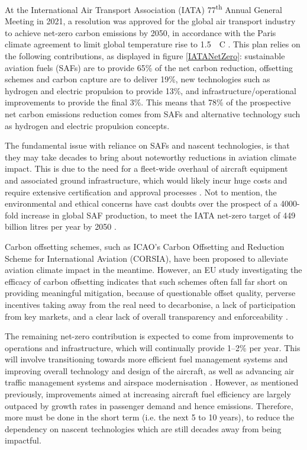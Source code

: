 At the International Air Transport Association (IATA) 77\textsuperscript{th} Annual General Meeting in 2021, a resolution was approved for the global air transport industry to achieve net-zero carbon emissions by 2050, in accordance with the Paris climate agreement to limit global temperature rise to 1.5~\textdegree~C \cite{IATANetZero}. This plan relies on the following contributions, as displayed in figure \ref{IATANetZero}: sustainable aviation fuels (SAFs) are to provide 65\% of the net carbon reduction, offsetting schemes and carbon capture are to deliver 19\%, new technologies such as hydrogen and electric propulsion to provide 13\%, and infrastructure/operational improvements to provide the final 3\%. This means that 78\% of the prospective net carbon emissions reduction comes from SAFs and alternative technology such as hydrogen and electric propulsion concepts. 

The fundamental issue with reliance on SAFs and nascent technologies, is that they may take decades to bring about noteworthy reductions in aviation climate impact. This is due to the need for a fleet-wide overhaul of aircraft equipment and associated ground infrastructure, which would likely incur huge costs and require extensive certification and approval processes \cite{ICF2021}. Not to mention, the environmental and ethical concerns have cast doubts over the prospect of a 4000-fold increase in global SAF production, to meet the IATA net-zero target of 449 billion litres per year by 2050 \cite{IATANetZero, Henoi2022}. 

Carbon offsetting schemes, such as ICAO's Carbon Offsetting and Reduction Scheme for International Aviation (CORSIA), have been proposed to alleviate aviation climate impact in the meantime. However, an EU study investigating the efficacy of carbon offsetting indicates that such schemes often fall far short on providing meaningful mitigation, because of questionable offset quality, perverse incentives taking away from the real need to decarbonise, a lack of participation from key markets, and a clear lack of overall transparency and enforceability \cite{TandE2021, TandE2020}.

The remaining net-zero contribution is expected to come from improvements to operations and infrastructure, which will continually provide 1--2\% per year. This will involve transitioning towards more efficient fuel management systems and improving overall technology and design of the aircraft, as well as advancing air traffic management systems and airspace modernisation \cite{Peeters2016}. However, as mentioned previously, improvements aimed at increasing aircraft fuel efficiency are largely outpaced by growth rates in passenger demand and hence emissions. Therefore, more must be done in the short term (i.e. the next 5 to 10 years), to reduce the dependency on nascent technologies which are still decades away from being impactful.

